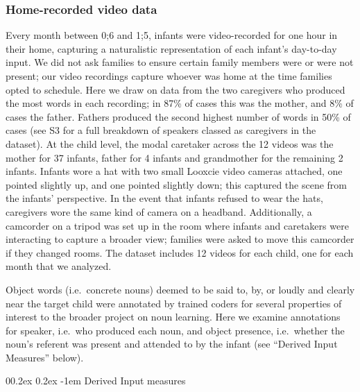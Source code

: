 \documentclass[
  man,mask,floatsintext]{apa6}
\makeatletter
\let\oldparagraph\paragraph
\renewcommand{\paragraph}[1]{\oldparagraph{#1}\mbox{}}
\renewcommand{\paragraph}{\@startsection{paragraph}{4}{\parindent}%
  {0\baselineskip \@plus 0.2ex \@minus 0.2ex}%
  {-1em}%
  {\normalfont\normalsize\bfseries\itshape\typesectitle}}
\makeatother
\begin{document}
\hypertarget{home-recorded-video-data}{%
\subsubsection{Home-recorded video data}\label{home-recorded-video-data}}

Every month between 0;6 and 1;5, infants were video-recorded for one hour in their home, capturing a naturalistic representation of each infant's day-to-day input. We did not ask families to ensure certain family members were or were not present; our video recordings capture whoever was home at the time families opted to schedule. Here we draw on data from the two caregivers who produced the most words in each recording; in 87\% of cases this was the mother, and 8\% of cases the father. Fathers produced the second highest number of words in 50\% of cases (see S3 for a full breakdown of speakers classed as caregivers in the dataset). At the child level, the modal caretaker across the 12 videos was the mother for 37 infants, father for 4 infants and grandmother for the remaining 2 infants. Infants wore a hat with two small Looxcie video cameras attached, one pointed slightly up, and one pointed slightly down; this captured the scene from the infants' perspective. In the event that infants refused to wear the hats, caregivers wore the same kind of camera on a headband. Additionally, a camcorder on a tripod was set up in the room where infants and caretakers were interacting to capture a broader view; families were asked to move this camcorder if they changed rooms. The dataset includes 12 videos for each child, one for each month that we analyzed.

Object words (i.e.~concrete nouns) deemed to be said to, by, or loudly and clearly near the target child were annotated by trained coders for several properties of interest to the broader project on noun learning. Here we examine annotations for speaker, i.e.~who produced each noun, and object presence, i.e.~whether the noun's referent was present and attended to by the infant (see ``Derived Input Measures'' below).

\hypertarget{derived-input-measures}{%
\paragraph{Derived Input measures}\label{derived-input-measures}}
\end{document}
